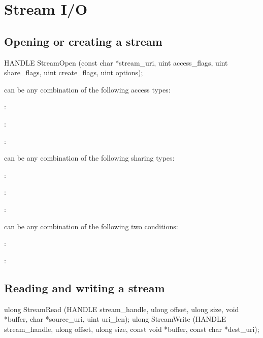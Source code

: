 \section{Stream I/O}
\label{sec:abi:streams}

\subsection*{Opening or creating a stream}

\begin{paldef}
HANDLE StreamOpen (const char *stream_uri,
                   uint access_flags, uint share_flags,
                   uint create_flags, uint options);
\end{paldef}


 can be any combination of the following access types:
\begin{compactitem}
\item {}:
\item {}:
\item {}:
\end{compactitem}


 can be any combination of the following sharing types:
\begin{compactitem}
\item {}:
\item {}:
\item {}:
\end{compactitem}


 can be any combination of the following two conditions:
\begin{compactitem}
\item {}:
\item {}:
\end{compactitem}



\subsection*{Reading and writing a stream}

\begin{paldef}
ulong StreamRead (HANDLE stream_handle,
                  ulong offset, ulong size, void *buffer,
                  char *source_uri, uint uri_len);
ulong StreamWrite (HANDLE stream_handle,
                   ulong offset, ulong size,
                   const void *buffer,
                   const char *dest_uri);
\end{paldef}


